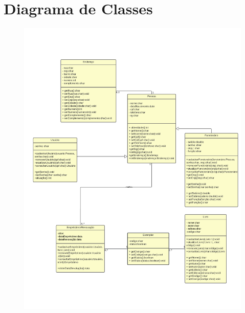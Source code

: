 \chapter{Diagrama de Classes}
\begin{figure}[h]
    \centering
    \includegraphics[width=0.8\linewidth]{Imagens/diagramadeclasses.pdf}
\end{figure}
